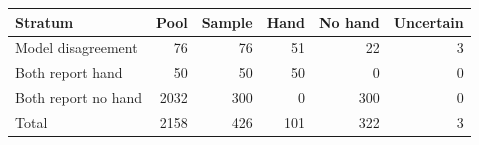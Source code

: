\begin{tabularx}{\linewidth}{Xrrrrr}
\toprule
Stratum & Pool & Sample & Hand & No hand & Uncertain\\
\midrule
Model disagreement & 76 & 76 & 51 & 22 & 3\\
Both report hand & 50 & 50 & 50 & 0 & 0\\
Both report no hand & 2032 & 300 & 0 & 300 & 0\\
\midrule
Total &2158&426&101&322&3\\
\bottomrule
\end{tabularx}
